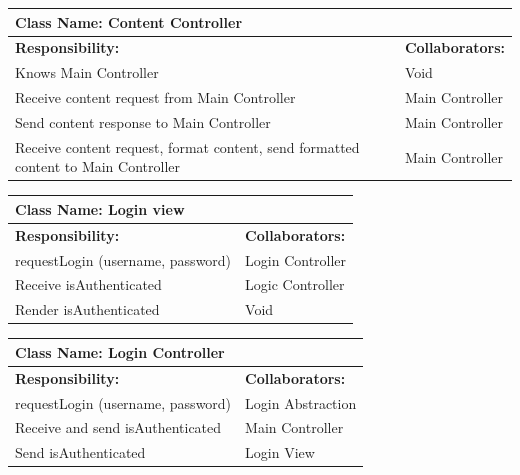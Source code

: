 \documentclass[]{article}
\begin{document}

	\begin{table}[H]
	\centering
		\begin{tabular}{|p{9cm}|p{3cm}|}
		\hline
		 \multicolumn{2}{|l|}{\textbf{Class Name: Content Controller}} \\
		\hline
		\textbf{Responsibility:} & \textbf{Collaborators:} \\
		\hline
		Knows Main Controller & Void\\
		\hline
		Receive content request from Main Controller & Main Controller\\
		\hline
		Send content response to Main Controller & Main Controller\\
		\hline
		Receive content request, format content, send formatted content to Main Controller & Main Controller \\
		\hline
		\end{tabular}
	\end{table}
	
	 
	\begin{table}[H]
	\centering
		\begin{tabular}{|p{9cm}|p{3cm}|}
		\hline
		 \multicolumn{2}{|l|}{\textbf{Class Name: Login view}} \\
		\hline
		\textbf{Responsibility:} & \textbf{Collaborators:} \\
		\hline
		requestLogin (username, password) & Login Controller\\
		\hline
		Receive isAuthenticated & Logic Controller\\
		\hline
		Render isAuthenticated & Void\\
		\hline
		\end{tabular}
	\end{table}
	
	\begin{table}[H]
	\centering
		\begin{tabular}{|p{9cm}|p{3cm}|}
		\hline
		 \multicolumn{2}{|l|}{\textbf{Class Name: Login Controller}} \\
		\hline
		\textbf{Responsibility:} & \textbf{Collaborators:} \\
		\hline
	    requestLogin (username, password) & Login Abstraction\\
		\hline
		Receive and send isAuthenticated & Main Controller\\
		\hline
		Send isAuthenticated & Login View\\
		\hline
		\end{tabular}
	\end{table}
	
\end{document}
